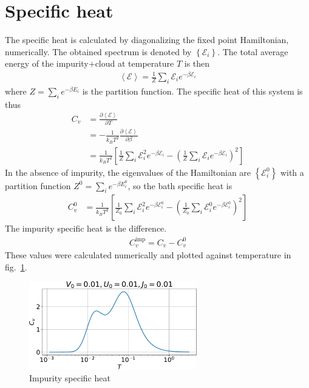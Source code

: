 \documentclass[twoside]{report}
\numberwithin{equation}{section}
\begin{document}
\section{Specific heat}
The specific heat is calculated by diagonalizing the fixed point Hamiltonian, numerically. The obtained spectrum is denoted by \(\left\{ \mathcal{E}_i \right\} \). The total average energy of the impurity+cloud at temperature \(T\) is then
\begin{equation}\begin{aligned}
	\left<\mathcal{E} \right> = \frac{1}{Z}\sum_{i} \mathcal{E}_i e^{-\beta \mathcal{E}_i}
\end{aligned}\end{equation}
where \(Z = \sum_{i} e^{-\beta E_i}\) is the partition function. The specific heat of this system is thus
\begin{equation}\begin{aligned}
	C_v &= \frac{\partial{\left<\mathcal{E} \right>}}{\partial{T}} \\
	    &= -\frac{1}{k_B T^2} \frac{\partial{\left<\mathcal{E} \right>}}{\partial{\beta}} \\
	    &= \frac{1}{k_B T^2}\left[\frac{1}{Z}\sum_i \mathcal{E}_i^2 e^{-\beta \mathcal{E}_i} - \left(\frac{1}{Z}\sum_i \mathcal{E}_i e^{-\beta \mathcal{E}_i}\right)^2 \right] 
\end{aligned}\end{equation}
In the absence of impurity, the eigenvalues of the Hamiltonian are \(\left\{\mathcal{E}_i^0\right\}\) with a partition function \(Z^0 = \sum_{i} e^{-\beta E_i^0}\), so the bath specific heat is
\begin{equation}\begin{aligned}
	C_v^0 &= \frac{1}{k_B T^2}\left[\frac{1}{Z_0}\sum_i \mathcal{E}_i^2 e^{-\beta \mathcal{E}_i^0} - \left(\frac{1}{Z_0}\sum_i \mathcal{E}_i^0 e^{-\beta \mathcal{E}_i^0}\right)^2 \right] 
\end{aligned}\end{equation}
The impurity specific heat is the difference.
\begin{equation}\begin{aligned}
	C_v^\text{imp} = C_v - C_v^0
\end{aligned}\end{equation}
These values were calculated numerically and plotted against temperature in fig.~\ref{cv}.
\begin{figure}[htpb]
	\centering
	\includegraphics[width=0.65\textwidth]{../figures/Cv_new.pdf}
	\caption{Impurity specific heat}
	\label{cv}
\end{figure}
\end{document}
